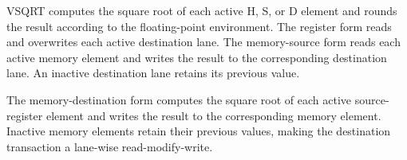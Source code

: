 VSQRT computes the square root of each active H, S, or D element and rounds the
result according to the floating-point environment. The register form reads
and overwrites each active destination lane. The memory-source form reads each
active memory element and writes the result to the corresponding destination
lane. An inactive destination lane retains its previous value.

The memory-destination form computes the square root of each active
source-register element and writes the result to the corresponding memory
element. Inactive memory elements retain their previous values, making the
destination transaction a lane-wise read-modify-write.
